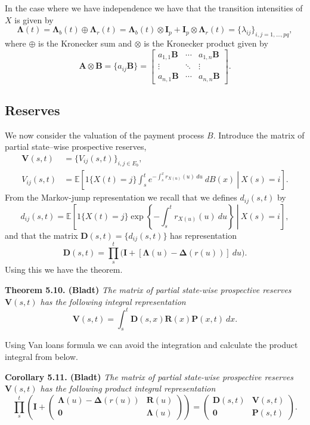 \documentclass[
]{book}
\begin{document}
In the case where we have independence we have that the transition intensities of \(X\) is given by
\[
\mathbf \Lambda(t)=\mathbf \Lambda_b(t)\oplus \mathbf\Lambda_r(t)=\mathbf \Lambda_b(t)\otimes \mathbf I_p+\mathbf I_p \otimes \mathbf \Lambda_r(t)=\{\lambda_{ij}\}_{i,j=1,...,pq},
\]
where \(\oplus\) is the Kronecker sum and \(\otimes\) is the Kronecker product given by
\[
\mathbf A\otimes \mathbf B=\{a_{ij}\mathbf B\}=\begin{bmatrix}
a_{1,1}\mathbf B & \cdots & a_{1,n}\mathbf B\\
\vdots & \ddots & \vdots\\
a_{n,1}\mathbf B & \cdots & a_{n,n}\mathbf B
\end{bmatrix}.
\]

\hypertarget{reserves}{%
\subsection{Reserves}\label{reserves}}

We now consider the valuation of the payment process \(B\). Introduce the matrix of partial state--wise prospective reserves,
\begin{align*}
\mathbf V(s,t)&=\{V_{ij}(s,t)\}_{i,j\in E_b},\\
V_{ij}(s,t)&=\mathbb E\left[\left.1\{X(t)=j\}\int_s^te^{-\int_s^xr_{X(u)}(u)\ du}\ dB(x) \ \right\vert\ X(s)=i\right].
\end{align*}
From the Markov-jump representation we recall that we defines \(d_{ij}(s,t)\) by
\[
d_{ij}(s,t)=\mathbb E\left[\left.1\{X(t)=j\}\exp\left\{-\int_s^tr_{X(u)}(u)\ du\right\} \ \right\vert\ X(s)=i\right],
\]
and that the matrix \(\mathbf D(s,t)=\{d_{ij}(s,t)\}\) has representation
\[
\mathbf D(s,t)=\prod_s^t\Big(\mathbf I+[\mathbf \Lambda(u)-\mathbf\Delta (r(u))]\ du\Big).
\]
Using this we have the theorem.

\textbf{Theorem 5.10. (Bladt)} \emph{The matrix of partial state-wise prospective reserves \(\mathbf V(s,t)\) has the following integral representation}
\[
\mathbf V(s,t)=\int_s^t\mathbf D(s,x)\mathbf R(x)\mathbf P(x,t)\ dx.
\]

Using Van loans formula we can avoid the integration and calculate the product integral from below.

\textbf{Corollary 5.11. (Bladt)} \emph{The matrix of partial state-wise prospective reserves \(\mathbf V(s,t)\) has the following product integral representation}
\[
\prod_s^t\left(\mathbf I+
\begin{pmatrix}
\mathbf \Lambda(u)-\mathbf \Delta (r(u)) & \mathbf R(u)\\
\mathbf 0 & \mathbf \Lambda(u)
\end{pmatrix}
\right)=\begin{pmatrix}
\mathbf D(s,t) & \mathbf V(s,t)\\
\mathbf 0 & \mathbf P(s,t)
\end{pmatrix}.
\]
\end{document}
